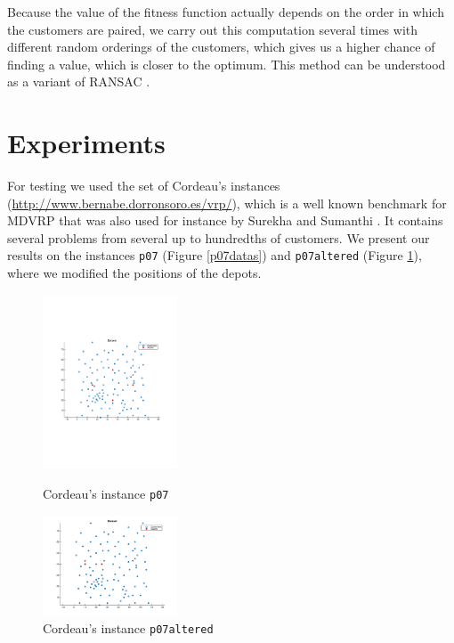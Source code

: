 \documentclass[conference]{IEEEtran}
\begin{document}
Because the value of the fitness function actually depends on the order in which the customers are paired, we carry out this computation several times with different random orderings of the customers, which gives us a higher chance of finding a value, which is closer to the optimum. This method can be understood as a variant of RANSAC \cite{fischler1981random}.



\section{Experiments}
For testing we used the set of Cordeau's instances (\url{http://www.bernabe.dorronsoro.es/vrp/}), which is a well known benchmark for MDVRP that was also used for instance by Surekha and Sumanthi \cite{surekha2011solution}. It contains several problems from several up to hundredths of customers. We present our results on the instances \texttt{p07} (Figure \ref{p07datas}) and \texttt{p07altered} (Figure \ref{p03datas}), where we modified the positions of the depots.
\begin{figure}
  \centering
  \begin{minipage}[t]{0.49\textwidth}
    \begin{center}
      \includegraphics[width=4cm]{images/p07dataset}
      \caption{Cordeau's instance \texttt{p07}}
      \label{p07datas}
    \end{center}
  \end{minipage}
  \hfill
  \begin{minipage}[t]{0.49\textwidth}
    \begin{center}
      \includegraphics[width=4cm]{images/p07altereddataset}
      \caption{Cordeau's instance \texttt{p07altered}}
      \label{p03datas}
    \end{center}
  \end{minipage}
\end{figure}
\end{document}
